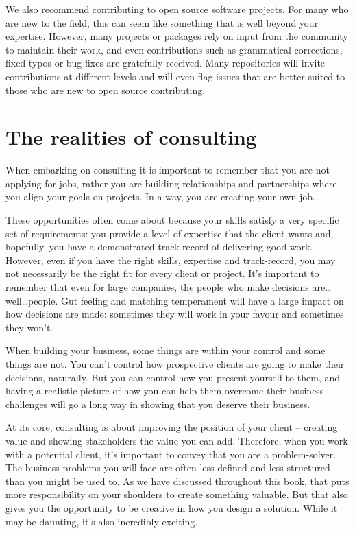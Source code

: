 \documentclass[
]{book}
\begin{document}
We also recommend contributing to open source software projects. For many who are new to the field, this can seem like something that is well beyond your expertise. However, many projects or packages rely on input from the community to maintain their work, and even contributions such as grammatical corrections, fixed typos or bug fixes are gratefully received. Many repositories will invite contributions at different levels and will even flag issues that are better-suited to those who are new to open source contributing.

\hypertarget{the-realities-of-consulting}{%
\section{The realities of consulting}\label{the-realities-of-consulting}}

When embarking on consulting it is important to remember that you are not applying for jobs, rather you are building relationships and partnerships where you align your goals on projects. In a way, you are creating your own job.

These opportunities often come about because your skills satisfy a very specific set of requirements: you provide a level of expertise that the client wants and, hopefully, you have a demonstrated track record of delivering good work. However, even if you have the right skills, expertise and track-record, you may not necessarily be the right fit for every client or project. It's important to remember that even for large companies, the people who make decisions are\ldots well\ldots people. Gut feeling and matching temperament will have a large impact on how decisions are made: sometimes they will work in your favour and sometimes they won't.

When building your business, some things are within your control and some things are not. You can't control how prospective clients are going to make their decisions, naturally. But you can control how you present yourself to them, and having a realistic picture of how you can help them overcome their business challenges will go a long way in showing that you deserve their business.

At its core, consulting is about improving the position of your client -- creating value and showing stakeholders the value you can add. Therefore, when you work with a potential client, it's important to convey that you are a problem-solver. The business problems you will face are often less defined and less structured than you might be used to. As we have discussed throughout this book, that puts more responsibility on your shoulders to create something valuable. But that also gives you the opportunity to be creative in how you design a solution. While it may be daunting, it's also incredibly exciting.
\end{document}

